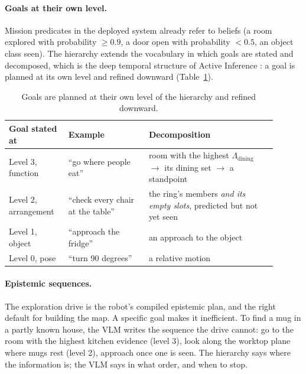 \paragraph{Goals at their own level.}
Mission predicates in the deployed system already refer to beliefs (a room explored with probability $\geq 0.9$, a
door open with probability $< 0.5$, an object class seen). The hierarchy extends the vocabulary in which goals are
stated and decomposed, which is the deep temporal structure of Active Inference \cite{friston2017deeptemporal}: a goal
is planned at its own level and refined downward (Table~\ref{tab:lh_goals}).

\begin{table}[ht]
    \centering
    \small
    \begin{tabular}{|>{\raggedright\arraybackslash}p{0.2\linewidth}|>{\raggedright\arraybackslash}p{0.27\linewidth}|>{\raggedright\arraybackslash}p{0.43\linewidth}|}
        \hline
        \textbf{Goal stated at} & \textbf{Example} & \textbf{Decomposition} \\ \hline
        Level 3, function    & ``go where people eat''           & room with the highest $\Lambda_{\text{dining}}$ $\to$ its dining set $\to$ a standpoint \\ \hline
        Level 2, arrangement & ``check every chair at the table'' & the ring's members \emph{and its empty slots}, predicted but not yet seen \\ \hline
        Level 1, object      & ``approach the fridge''           & an approach to the object \\ \hline
        Level 0, pose        & ``turn 90 degrees''               & a relative motion \\ \hline
    \end{tabular}
    \caption{Goals are planned at their own level of the hierarchy and refined downward.}
    \label{tab:lh_goals}
\end{table}

\paragraph{Epistemic sequences.}
The exploration drive is the robot's compiled epistemic plan, and the right default for building the map. A specific
goal makes it inefficient. To find a mug in a partly known house, the VLM writes the sequence the drive cannot: go to
the room with the highest kitchen evidence (level 3), look along the worktop plane where mugs rest (level 2), approach
once one is seen. The hierarchy says where the information is; the VLM says in what order, and when to stop.

